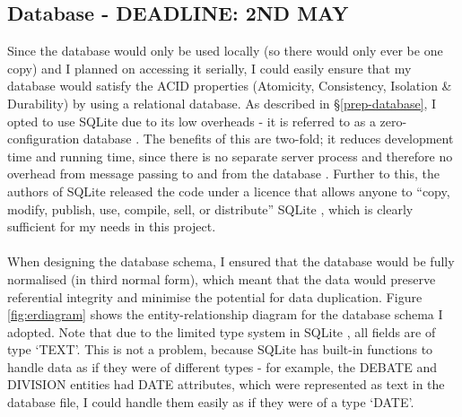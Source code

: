 \documentclass[12pt,a4paper,twoside,openright]{report}
\newcommand{\mylisting}[4]{}
\newcommand{\pylisting}[2]{\mylisting{Python}{py}{#1}{#2}}
\begin{document}
\pylisting{Function that matches an MP's name in the Hansard }{match_full_name}

\subsection{Database - DEADLINE: 2ND MAY} \label{impl-database}

Since the database would only be used locally (so there would only ever be one copy) and I planned on accessing it serially, I could easily ensure that my database would satisfy the ACID properties (Atomicity, Consistency, Isolation \& Durability) by using a relational database. As described in \S\ref{prep-database}, I opted to use SQLite due to its low overheads - it is referred to as a zero-configuration database \cite{sqlitezeroconfig}. The benefits of this are two-fold; it reduces development time and running time, since there is no separate server process and therefore no overhead from message passing to and from the database \cite{sqliteserverless}. Further to this, the authors of SQLite released the code under a licence that allows anyone to ``copy, modify, publish, use, compile, sell, or distribute'' SQLite \cite{sqlitelicence}, which is clearly sufficient for my needs in this project.
\\\\
When designing the database schema, I ensured that the database would be fully normalised (in third normal form), which meant that the data would preserve referential integrity and minimise the potential for data duplication. Figure \ref{fig:erdiagram} shows the entity-relationship diagram for the database schema I adopted. Note that due to the limited type system in SQLite \cite{sqlitetypes}, all fields are of type `TEXT'. This is not a problem, because SQLite has built-in functions to handle data as if they were of different types - for example, the DEBATE and DIVISION entities had DATE attributes, which were represented as text in the database file, I could handle them easily as if they were of a type `DATE'.
\\\\
\end{document}

